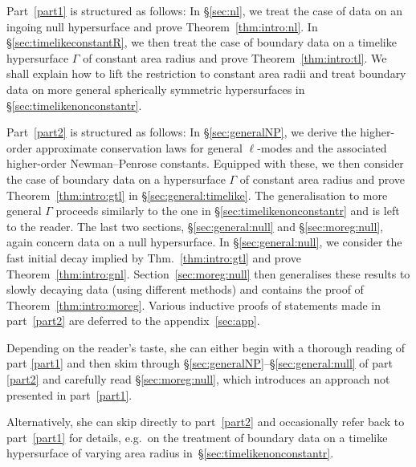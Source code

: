 \documentclass[11pt,english]{article}
\numberwithin{equation}{section}
\theoremstyle{remark}
\theoremstyle{plain}
\theoremstyle{remark}
\renewcommand{\(}{\left(}
\renewcommand{\)}{\right)}
\begin{document}
Part~\ref{part1} is structured as follows: 
In \S\ref{sec:nl}, we treat the case of data on an ingoing null hypersurface and prove Theorem~\ref{thm:intro:nl}. 
In \S\ref{sec:timelikeconstantR}, we then treat the case of boundary data on a timelike hypersurface $\Gamma$ of constant area radius and prove Theorem~\ref{thm:intro:tl}. 
We shall explain how to lift the restriction to constant area radii and treat boundary data on more general spherically symmetric hypersurfaces in \S\ref{sec:timelikenonconstantr}.

Part~\ref{part2} is structured as follows: 
In \S\ref{sec:generalNP}, we derive the higher-order approximate conservation laws for general $\ell$-modes and the associated higher-order Newman--Penrose constants.
Equipped with these, we then consider the case of boundary data on a hypersurface $\Gamma$ of constant area radius and prove Theorem~\ref{thm:intro:gtl} in \S\ref{sec:general:timelike}. The generalisation to more general $\Gamma$ proceeds similarly to the one in \S\ref{sec:timelikenonconstantr} and is left to the reader.
The last two sections, \S\ref{sec:general:null} and \S\ref{sec:moreg:null}, again concern data on a null hypersurface. 
In \S\ref{sec:general:null}, we consider the fast initial decay implied by Thm.~\ref{thm:intro:gtl} and prove  Theorem~\ref{thm:intro:gnl}. 
Section~\ref{sec:moreg:null} then generalises these results to slowly decaying data (using different methods) and contains the proof of Theorem~\ref{thm:intro:moreg}.
Various inductive proofs of statements made in part~\ref{part2} are deferred to the appendix~\ref{sec:app}.

Depending on the reader's taste, she can either begin with a thorough reading of part \ref{part1} and then skim through \S\ref{sec:generalNP}--\S\ref{sec:general:null} of part \ref{part2} and carefully read \S\ref{sec:moreg:null}, which introduces an approach not presented in part~\ref{part1}.

Alternatively, she can skip directly to part~\ref{part2} and occasionally refer back to part~\ref{part1} for details, e.g.\ on the treatment of boundary data on a timelike hypersurface of varying area radius in~\S\ref{sec:timelikenonconstantr}.
\end{document}
